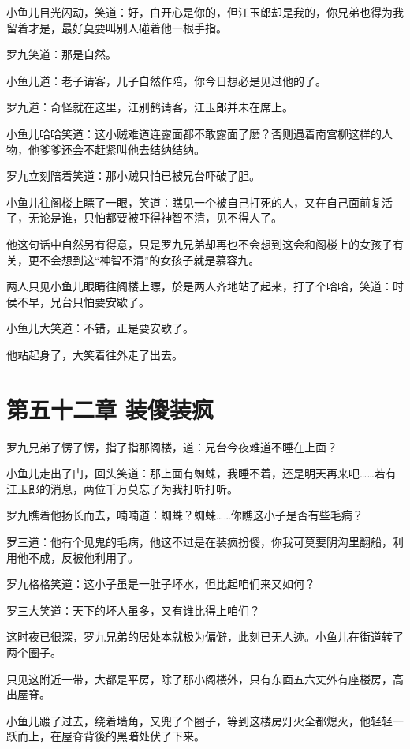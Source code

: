 \documentclass[12pt,oneside]{book}
\begin{document}
小鱼儿目光闪动，笑道：好，白开心是你的，但江玉郎却是我的，你兄弟也得为我留着才是，最好莫要叫别人碰着他一根手指。

罗九笑道：那是自然。

小鱼儿道：老子请客，儿子自然作陪，你今日想必是见过他的了。

罗九道：奇怪就在这里，江别鹤请客，江玉郎并未在席上。

小鱼儿哈哈笑道：这小贼难道连露面都不敢露面了麽？否则遇着南宫柳这样的人物，他爹爹还会不赶紧叫他去结纳结纳。

罗九立刻陪着笑道：那小贼只怕已被兄台吓破了胆。

小鱼儿往阁楼上瞟了一眼，笑道：瞧见一个被自己打死的人，又在自己面前复活了，无论是谁，只怕都要被吓得神智不清，见不得人了。

他这句话中自然另有得意，只是罗九兄弟却再也不会想到这会和阁楼上的女孩子有关，更不会想到这``神智不清''的女孩子就是慕容九。

两人只见小鱼儿眼睛往阁楼上瞟，於是两人齐地站了起来，打了个哈哈，笑道：时侯不早，兄台只怕要安歇了。

小鱼儿大笑道：不错，正是要安歇了。

他站起身了，大笑着往外走了出去。

\hypertarget{ux7b2cux4e94ux5341ux4e8cux7ae0-ux88c5ux50bbux88c5ux75af}{%
\chapter{第五十二章
装傻装疯}\label{ux7b2cux4e94ux5341ux4e8cux7ae0-ux88c5ux50bbux88c5ux75af}}

罗九兄弟了愣了愣，指了指那阁楼，道：兄台今夜难道不睡在上面？

小鱼儿走出了门，回头笑道：那上面有蜘蛛，我睡不着，还是明天再来吧\ldots\ldots 若有江玉郎的消息，两位千万莫忘了为我打听打听。

罗九瞧着他扬长而去，喃喃道：蜘蛛？蜘蛛\ldots\ldots 你瞧这小子是否有些毛病？

罗三道：他有个见鬼的毛病，他这不过是在装疯扮傻，你我可莫要阴沟里翻船，利用他不成，反被他利用了。

罗九格格笑道：这小子虽是一肚子坏水，但比起咱们来又如何？

罗三大笑道：天下的坏人虽多，又有谁比得上咱们？

这时夜已很深，罗九兄弟的居处本就极为偏僻，此刻已无人迹。小鱼儿在街道转了两个圈子。

只见这附近一带，大都是平房，除了那小阁楼外，只有东面五六丈外有座楼房，高出屋脊。

小鱼儿踱了过去，绕着墙角，又兜了个圈子，等到这楼房灯火全都熄灭，他轻轻一跃而上，在屋脊背後的黑暗处伏了下来。
\end{document}
